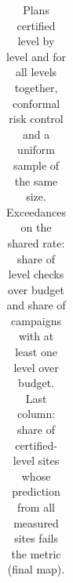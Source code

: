 \documentclass{iopjournal}
\begin{document}
{\renewcommand{\thetable}{S5.4}\small
\begin{longtable}[]{@{}
  >{\raggedright\arraybackslash}p{}
  >{\raggedright\arraybackslash}p{}
  >{\raggedright\arraybackslash}p{}
  >{\raggedright\arraybackslash}p{}
  >{\raggedright\arraybackslash}p{}
  >{\raggedright\arraybackslash}p{}
  >{\raggedright\arraybackslash}p{}@{}}
\caption{Plans certified level by level and for all levels together, conformal risk control and a uniform sample of the same size. Exceedances on the shared rate: share of level checks over budget and share of campaigns with at least one level over budget. Last column: share of certified-level sites whose prediction from all measured sites fails the metric (final map).}\label{tab:S5.4}\\


\end{longtable}}
\end{document}
